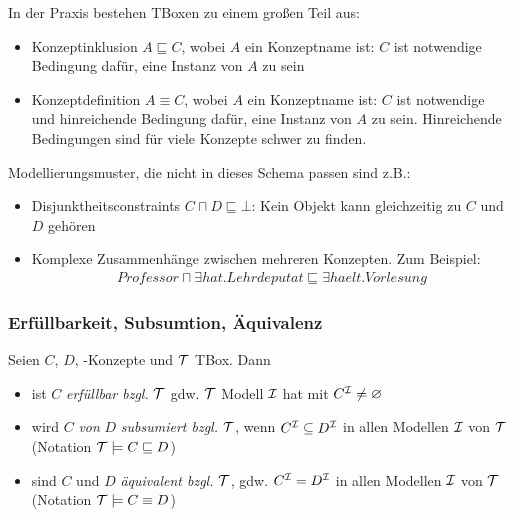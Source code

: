In der Praxis bestehen TBoxen zu einem großen Teil aus:

\begin{itemize}
\item Konzeptinklusion $A \sqsubseteq C$, wobei $A$ ein Konzeptname ist: $C$ ist notwendige Bedingung dafür, eine Instanz von $A$ zu sein
\item Konzeptdefinition $A \equiv C$, wobei $A$ ein Konzeptname ist: $C$ ist notwendige und hinreichende Bedingung dafür, eine Instanz von $A$ zu sein.
    Hinreichende Bedingungen sind für viele Konzepte schwer zu finden.
    \end{itemize}
Modellierungsmuster, die nicht in dieses Schema passen sind z.B.:
\begin{itemize}
\item Disjunktheitsconstraints $C \sqcap D \sqsubseteq \bot$: Kein Objekt kann gleichzeitig zu $C$ und $D$ gehören
\item Komplexe Zusammenhänge zwischen mehreren Konzepten. Zum Beispiel:
    \begin{align*}
        \mathit{Professor} \sqcap \exists \mathit{hat}.\mathit{Lehrdeputat} \sqsubseteq \exists \mathit{haelt}.\mathit{Vorlesung}
    \end{align*}
\end{itemize}

\subsubsection{Erfüllbarkeit, Subsumtion, Äquivalenz}
\label{sec:tbox-erfuellbarkeit}
\label{erfuxfcllbarkeit-subsumtion-uxe4quivalenz-1}

\begin{definition} 
Seien $C$, $D$, \ALC-Konzepte und $\mathcal{T}$ TBox. Dann

\begin{itemize}
  \item ist $C$ \emph{erfüllbar bzgl.} $\mathcal{T}$ gdw. $\mathcal{T}$ Modell $\mathcal{I}$ hat mit $C^{\mathcal{I}} \neq \varnothing$
  \item wird $C$ \emph{von} $D$ \emph{subsumiert bzgl.} $\mathcal{T}$, wenn $C^{\mathcal{I}} \subseteq D^{\mathcal{I}}$ in allen Modellen $\mathcal{I}$ von $\mathcal{T}$ (Notation $\mathcal{T} \models C \sqsubseteq D$)
  \item sind $C$ und $D$ \emph{äquivalent bzgl.} $\mathcal{T}$, gdw. $C^{\mathcal{I}} = D^{\mathcal{I}}$ in allen Modellen $\mathcal{I}$ von $\mathcal{T}$ (Notation $\mathcal{T} \models C \equiv D$)
\end{itemize}
\end{definition}

